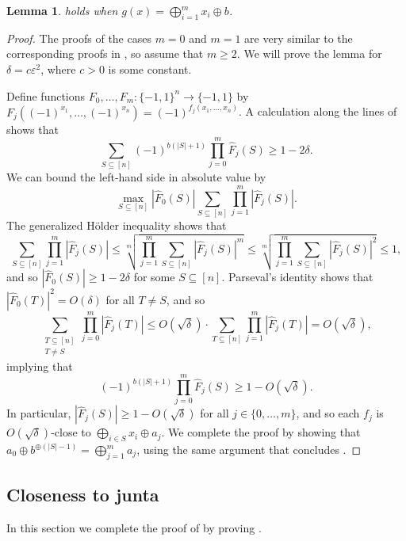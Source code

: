 \documentclass{article}
\newtheorem{lemma}[theorem]{Lemma}
\theoremstyle{definition}
\theoremstyle{remark}
\newcommand\eps{\varepsilon}
\renewcommand\epsilon{\eps}
\renewcommand\geq{\geqslant}
\renewcommand\leq{\leqslant}
\begin{document}
\begin{lemma} \label{lem:approximate-multi-polymorphisms-xor}
 holds when $g(x) = \bigoplus_{i = 1}^m x_i \oplus b$.
\end{lemma}
\begin{proof}
The proofs of the cases $m = 0$ and $m = 1$ are very similar to the corresponding proofs in , so assume that $m \geq 2$. We will prove the lemma for $\delta = c\epsilon^2$, where $c>0$ is some constant.

Define functions $F_0,\ldots,F_m\colon \{-1,1\}^n \to \{-1,1\}$ by $F_j((-1)^{x_1},\ldots,(-1)^{x_n}) = (-1)^{f_j(x_1,\ldots,x_n)}$. A calculation along the lines of  shows that
\[
 \sum_{S \subseteq [n]} (-1)^{b(|S|+1)} \prod_{j=0}^m \hat{F}_j(S) \geq 1 - 2\delta.
\]
We can bound the left-hand side in absolute value by
\[
 \max_{S \subseteq [n]} |\hat{F}_0(S)| \sum_{S \subseteq [n]} \prod_{j=1}^m |\hat{F}_j(S)|.
\]
The generalized H\"older inequality shows that
\[
 \sum_{S \subseteq [n]} \prod_{j=1}^m |\hat{F}_j(S)| \leq
 \sqrt[m]{\prod_{j=1}^m \sum_{S \subseteq [n]} |\hat{F}_j(S)|^m} \leq
 \sqrt[m]{\prod_{j=1}^m \sum_{S \subseteq [n]} |\hat{F}_j(S)|^2} \leq 1,
\]
and so $|\hat{F}_0(S)| \geq 1-2\delta$ for some $S \subseteq [n]$. Parseval's identity shows that $|\hat{F}_0(T)|^2 = O(\delta)$ for all $T \neq S$, and so
\[
 \sum_{\substack{T \subseteq [n] \\ T \neq S}} \prod_{j=0}^m |\hat{F}_j(T)| \leq O(\sqrt{\delta}) \cdot \sum_{T \subseteq [n]} \prod_{j=1}^m |\hat{F}_j(T)| = O(\sqrt{\delta}),
\]
implying that
\[
 (-1)^{b(|S|+1)} \prod_{j=0}^m \hat{F}_j(S) \geq 1 - O(\sqrt{\delta}).
\]
In particular, $|\hat{F}_j(S)| \geq 1 - O(\sqrt{\delta})$ for all $j \in \{0,\ldots,m\}$, and so each $f_j$ is $O(\sqrt{\delta})$-close to $\bigoplus_{i \in S} x_i \oplus a_j$. We complete the proof by showing that $a_0 \oplus b^{\oplus (|S|-1)} = \bigoplus_{j=1}^m a_j$, using the same argument that concludes .
\end{proof}

\subsection{Closeness to junta}
\label{sec:approximate-multi-polymorphisms-junta}

In this section we complete the proof of  by proving .
\end{document}
